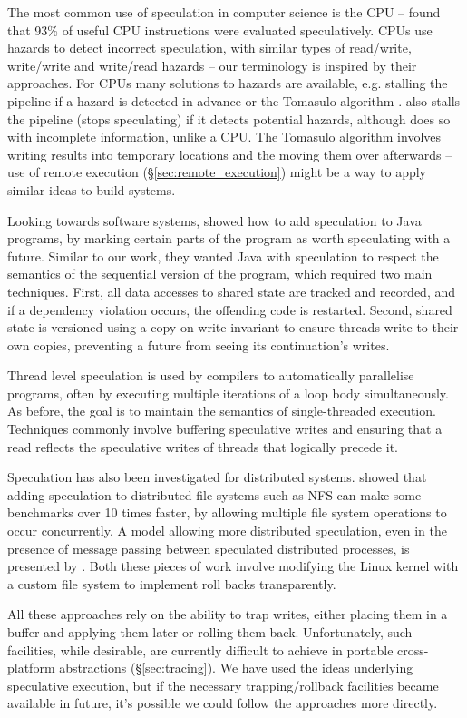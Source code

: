 The most common use of speculation in computer science is the CPU -- \citet{swanson_cpu_speculation} found that 93\% of useful CPU instructions were evaluated speculatively. CPUs use hazards to detect incorrect speculation, with similar types of read/write, write/write and write/read hazards \cite{patterson_cpu_design} -- our terminology is inspired by their approaches. For CPUs many solutions to hazards are available, e.g. stalling the pipeline if a hazard is detected in advance or the Tomasulo algorithm \cite{tomasulo}. \Rattle also stalls the pipeline (stops speculating) if it detects potential hazards, although does so with incomplete information, unlike a CPU. The Tomasulo algorithm involves writing results into temporary locations and the moving them over afterwards -- use of remote execution (\S\ref{sec:remote_execution}) might be a way to apply similar ideas to build systems.

Looking towards software systems, \citet{welc2005safe} showed how to add speculation to Java programs, by marking certain parts of the program as worth speculating with a future. Similar to our work, they wanted Java with speculation to respect the semantics of the sequential version of the program, which required two main techniques. First, all data accesses to shared state are tracked and recorded, and if a dependency violation occurs, the offending code is restarted.  Second, shared state is versioned using a copy-on-write invariant to ensure threads write to their own copies, preventing a future from seeing its continuation's writes.

Thread level speculation \cite{steffan1998potential} is used by compilers to automatically parallelise programs, often by executing multiple iterations of a loop body simultaneously. As before, the goal is to maintain the semantics of single-threaded execution. Techniques commonly involve buffering speculative writes \cite{steffan2000scalable} and ensuring that a read reflects the speculative writes of threads that logically precede it.

Speculation has also been investigated for distributed systems. \citet{nightingale2005speculative} showed that adding speculation to distributed file systems such as NFS can make some benchmarks over 10 times faster, by allowing multiple file system operations to occur concurrently. A model allowing more distributed speculation, even in the presence of message passing between speculated distributed processes, is presented by \citet{tapus2006distributed}. Both these pieces of work involve modifying the Linux kernel with a custom file system to implement roll backs transparently.

All these approaches rely on the ability to trap writes, either placing them in a buffer and applying them later or rolling them back. Unfortunately, such facilities, while desirable, are currently difficult to achieve in portable cross-platform abstractions (\S\ref{sec:tracing}). We have used the ideas underlying speculative execution, but if the necessary trapping/rollback facilities became available in future, it's possible we could follow the approaches more directly.
